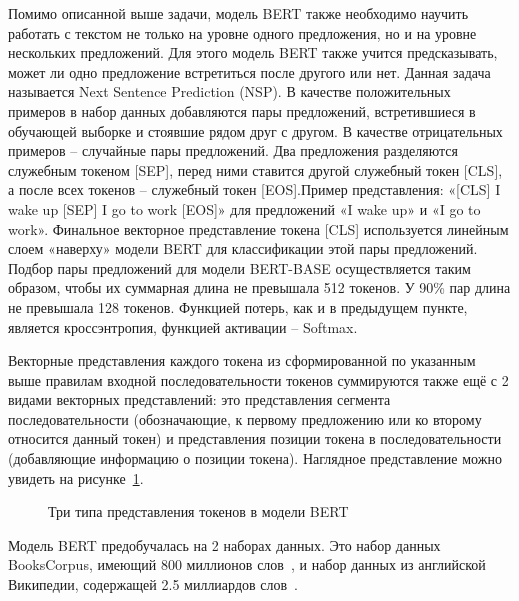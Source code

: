 Помимо описанной выше задачи, модель BERT также необходимо научить работать с текстом не только на уровне одного предложения, но и на уровне нескольких предложений. Для этого модель BERT также учится предсказывать, может ли одно предложение встретиться после другого или нет. Данная задача называется Next Sentence Prediction (NSP). В качестве положительных примеров в набор данных добавляются пары предложений, встретившиеся в обучающей выборке и стоявшие рядом друг с другом. В качестве отрицательных примеров -- случайные пары предложений. Два предложения разделяются служебным токеном [SEP], перед ними ставится другой служебный токен [CLS], а после всех токенов -- служебный токен [EOS].Пример представления: «[CLS] I wake up [SEP] I go to work [EOS]» для предложений «I wake up» и «I go to work». Финальное векторное представление токена [CLS] используется линейным слоем «наверху» модели BERT для классификации этой пары предложений. Подбор пары предложений для модели BERT-BASE осуществляется таким образом, чтобы их суммарная длина не превышала 512 токенов. У 90\% пар длина не превышала 128 токенов. Функцией потерь, как и в предыдущем пункте, является кроссэнтропия, функцией активации -- Softmax.

Векторные представления каждого токена из сформированной по указанным выше правилам входной последовательности токенов суммируются также ещё с 2 видами векторных представлений: это представления сегмента последовательности (обозначающие, к первому предложению или ко второму относится данный токен) и представления позиции токена в последовательности (добавляющие информацию о позиции токена). Наглядное представление можно увидеть на рисунке~\ref{fig:Transformer5-BERTTokenTypes}. 

\begin{figure}[ht]
 \caption{Три типа представления токенов в модели BERT}\label{fig:Transformer5-BERTTokenTypes}
\end{figure}
Модель BERT предобучалась на 2 наборах данных. Это набор данных BooksCorpus, имеющий 800 миллионов слов~\cite{zhu_2015}, и набор данных из английской Википедии, содержащей 2.5 миллиардов слов~\cite{devlin_2018}. 

